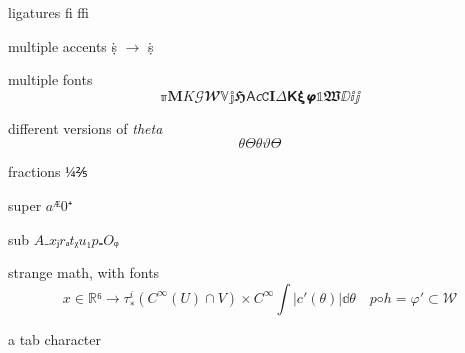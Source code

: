 \documentclass[a4paper,english]{article}
\begin{document}
ligatures ﬁ ﬃ

multiple accents ṩ \(→\)  \.{\d{s}}

multiple fonts
\[ ℼ 𝐌 𝐾 𝒢 𝓦 𝕍 𝕛 𝕳 𝖠 𝘤 𝙲 𝚰 𝛥 𝝟 𝝽 𝞿 𝟙 𝖂 ⅅ ⅈ ⅉ\]



different versions of \emph{theta}
\[\theta Θ  θ  ϑ  ϴ \]

fractions
\(¼ ⅖ \)

super \(aᴭ 0⁺\)

sub \(A₋ xⱼ rₐ tᵪ u₁ p₌ Oᵩ\)


strange math, with fonts
\[𝑥 ∈ ℝ⁶→  τ_∗^ i (C ^ ∞ (U ) ∩ V) × 𝐶^ ∞  ∫ |𝑐' (𝜃)| 𝕕𝜃 \quad 𝑝◦ℎ = 𝜑' ⊂ 𝒲\]

a	tab character
\end{document}
